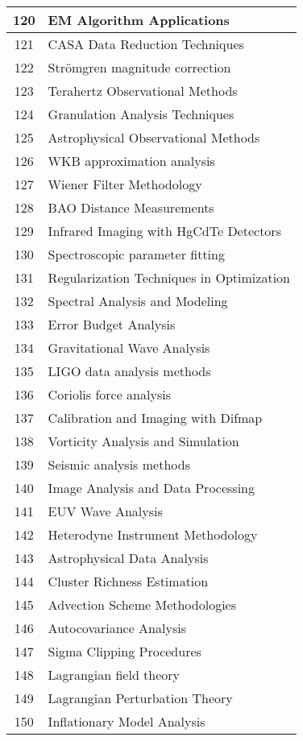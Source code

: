\begin{table}[htbp]
\begin{tabular}{|c|l|}
\hline
120 & EM Algorithm Applications \\
\hline
121 & CASA Data Reduction Techniques \\
\hline
122 & Strömgren magnitude correction \\
\hline
123 & Terahertz Observational Methods \\
\hline
124 & Granulation Analysis Techniques \\
\hline
125 & Astrophysical Observational Methods \\
\hline
126 & WKB approximation analysis \\
\hline
127 & Wiener Filter Methodology \\
\hline
128 & BAO Distance Measurements \\
\hline
129 & Infrared Imaging with HgCdTe Detectors \\
\hline
130 & Spectroscopic parameter fitting \\
\hline
131 & Regularization Techniques in Optimization \\
\hline
132 & Spectral Analysis and Modeling \\
\hline
133 & Error Budget Analysis \\
\hline
134 & Gravitational Wave Analysis \\
\hline
135 & LIGO data analysis methods \\
\hline
136 & Coriolis force analysis \\
\hline
137 & Calibration and Imaging with Difmap \\
\hline
138 & Vorticity Analysis and Simulation \\
\hline
139 & Seismic analysis methods \\
\hline
140 & Image Analysis and Data Processing \\
\hline
141 & EUV Wave Analysis \\
\hline
142 & Heterodyne Instrument Methodology \\
\hline
143 & Astrophysical Data Analysis \\
\hline
144 & Cluster Richness Estimation \\
\hline
145 & Advection Scheme Methodologies \\
\hline
146 & Autocovariance Analysis \\
\hline
147 & Sigma Clipping Procedures \\
\hline
148 & Lagrangian field theory \\
\hline
149 & Lagrangian Perturbation Theory \\
\hline
150 & Inflationary Model Analysis \\

\end{tabular}
\end{table}
